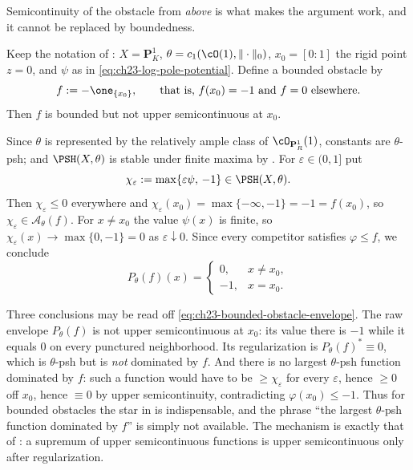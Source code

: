 Semicontinuity of the obstacle from \emph{above} is what makes the argument
work, and it cannot be replaced by boundedness.

\begin{example}
\label{ex:ch23-bounded-obstacle-failure}
Keep the notation of : $X=\mathbf P^1_K$,
$\theta=c_1(\cO(1),\|\cdot\|_0)$, $x_0=[0:1]$ the rigid point $z=0$,
and $\psi$ as in \eqref{eq:ch23-log-pole-potential}.  Define a bounded
obstacle by
\[
 f:=-\one_{\{x_0\}},
 \qquad\text{that is, } f(x_0)=-1 \text{ and } f=0 \text{ elsewhere}.
\]
Then $f$ is bounded but not upper semicontinuous at $x_0$.

Since $\theta$ is represented by the relatively ample class of
$\cO_{\mathbf P^1_R}(1)$, constants are $\theta$-psh; and
$\PSH(X,\theta)$ is stable under finite maxima by
.  For $\varepsilon\in(0,1]$ put
\[
 \chi_\varepsilon:=\max\{\varepsilon\psi,\,-1\}\in\PSH(X,\theta).
\]
Then $\chi_\varepsilon\leq0$ everywhere and
$\chi_\varepsilon(x_0)=\max\{-\infty,-1\}=-1=f(x_0)$, so
$\chi_\varepsilon\in\mathcal A_\theta(f)$.  For $x\ne x_0$ the value
$\psi(x)$ is finite, so
$\chi_\varepsilon(x)\to\max\{0,-1\}=0$ as $\varepsilon\downarrow0$.
Since every competitor satisfies $\varphi\leq f$, we conclude
\begin{equation}\label{eq:ch23-bounded-obstacle-envelope}
 P_\theta(f)(x)=
 \begin{cases}
  0,& x\ne x_0,\\
  -1,& x=x_0 .
 \end{cases}
\end{equation}

Three conclusions may be read off \eqref{eq:ch23-bounded-obstacle-envelope}.
The raw envelope $P_\theta(f)$ is not upper semicontinuous at $x_0$: its
value there is $-1$ while it equals $0$ on every punctured neighborhood.
Its regularization is $P_\theta(f)^*\equiv0$, which is $\theta$-psh but
is \emph{not} dominated by $f$.  And there is no largest $\theta$-psh
function dominated by $f$: such a function would have to be $\geq
\chi_\varepsilon$ for every $\varepsilon$, hence $\geq0$ off $x_0$,
hence $\equiv 0$ by upper semicontinuity, contradicting
$\varphi(x_0)\leq-1$.  Thus for bounded obstacles the star in
 is indispensable, and the phrase ``the largest
$\theta$-psh function dominated by $f$'' is simply not available.  The
mechanism is exactly that of : a supremum of upper
semicontinuous functions is upper semicontinuous only after regularization.
\end{example}

